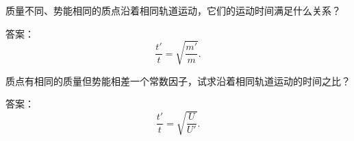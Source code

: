 \begin{xiti}

\quad 质量不同、势能相同的质点沿着相同轨道运动，它们的运动时间满足什么关系？

答案：
\begin{equation*}
  \frac{t'}{t}=\sqrt{\frac{m'}{m}}.
\end{equation*}

\quad 质点有相同的质量但势能相差一个常数因子，试求沿着相同轨道运动的时间之比？

答案：
\begin{equation*}
  \frac{t'}{t}=\sqrt{\frac{U}{U'}}.
\end{equation*}

\end{xiti}
